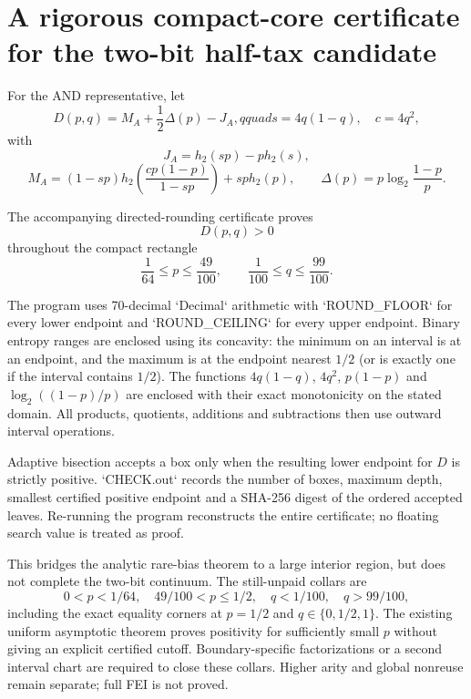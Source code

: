 \section*{A rigorous compact-core certificate for the two-bit half-tax candidate}

For the AND representative, let
\[
 D(p,q)=M_A+\frac12\Delta(p)-J_A,qquad
 s=4q(1-q),\quad c=4q^2,
\]
with
\[
 J_A=h_2(sp)-p h_2(s),
\]
\[
 M_A=(1-sp)h_2\!\left(\frac{cp(1-p)}{1-sp}\right)+sp h_2(p),
 \qquad
 \Delta(p)=p\log_2\frac{1-p}{p}.
\]

The accompanying directed-rounding certificate proves
\[
 \boxed{D(p,q)>0}
\]
throughout the compact rectangle
\[
 \frac1{64}\le p\le\frac{49}{100},
 \qquad
 \frac1{100}\le q\le\frac{99}{100}.
\]

The program uses 70-decimal `Decimal` arithmetic with `ROUND_FLOOR` for
every lower endpoint and `ROUND_CEILING` for every upper endpoint.  Binary
entropy ranges are enclosed using its concavity: the minimum on an interval
is at an endpoint, and the maximum is at the endpoint nearest $1/2$ (or is
exactly one if the interval contains $1/2$).  The functions
$4q(1-q)$, $4q^2$, $p(1-p)$ and
$\log_2((1-p)/p)$ are enclosed with their exact monotonicity on the stated
domain.  All products, quotients, additions and subtractions then use
outward interval operations.

Adaptive bisection accepts a box only when the resulting lower endpoint for
$D$ is strictly positive.  `CHECK.out` records the number of boxes, maximum
depth, smallest certified positive endpoint and a SHA-256 digest of the
ordered accepted leaves.  Re-running the program reconstructs the entire
certificate; no floating search value is treated as proof.

This bridges the analytic rare-bias theorem to a large interior region, but
does not complete the two-bit continuum.  The still-unpaid collars are
\[
 0<p<1/64,
 \quad 49/100<p\le1/2,
 \quad q<1/100,
 \quad q>99/100,
\]
including the exact equality corners at $p=1/2$ and $q\in\{0,1/2,1\}$.
The existing uniform asymptotic theorem proves positivity for sufficiently
small $p$ without giving an explicit certified cutoff.  Boundary-specific
factorizations or a second interval chart are required to close these
collars.  Higher arity and global nonreuse remain separate; full FEI is not
proved.

